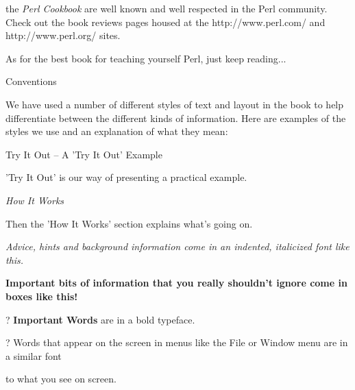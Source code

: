 \documentclass[a4paper,11pt]{book}
\begin{document}
\noindent the \textit{Perl Cookbook }are well known and well respected in the Perl community. Check out the book reviews pages housed at the http://www.perl.com/ and http://www.perl.org/ sites.

\noindent 

\noindent 

\noindent As for the best book for teaching yourself Perl, just keep reading...

\noindent 

\noindent 

\noindent Conventions

\noindent 

\noindent We have used a number of different styles of text and layout in the book to help differentiate between the different kinds of information. Here are examples of the styles we use and an explanation of what they mean:

\noindent 

\noindent Try It Out -- A 'Try It Out' Example

\noindent 

\noindent 'Try It Out' is our way of presenting a practical example.

\noindent 

\noindent \textit{How It Works}

\noindent Then the 'How It Works' section explains what's going on.

\noindent 

\noindent \textit{Advice, hints and background information come in an indented, italicized font like this.}

\noindent 

\noindent 

\noindent 

\noindent 

\noindent \textbf{Important bits of information that you really shouldn't ignore come in boxes like this!}

\noindent 

\noindent 

\noindent 

\noindent ? \textbf{Important Words }are in a bold typeface.

\noindent 

\noindent ? Words that appear on the screen in menus like the File or Window menu are in a similar font

\noindent to what you see on screen.

\noindent 
\end{document}
